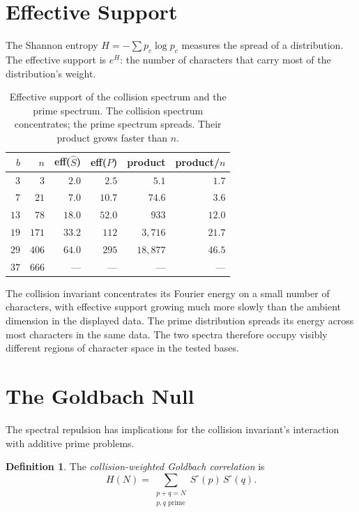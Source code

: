 \documentclass[12pt]{amsart}
\theoremstyle{definition}
\newtheorem{definition}[theorem]{Definition}
\theoremstyle{remark}
\begin{document}
\section{Effective Support}

The Shannon entropy $H = -\sum p_c \log p_c$ measures
the spread of a distribution. The effective support is
$e^H$: the number of characters that carry most of the
distribution's weight.

\begin{table}[h]
\centering
\begin{tabular}{rrrrrr}
\toprule
$b$ & $n$ & eff($\hat{S}$) & eff($P$) &
product & product/$n$ \\
\midrule
$3$ & $3$ & $2.0$ & $2.5$ & $5.1$ & $1.7$ \\
$7$ & $21$ & $7.0$ & $10.7$ & $74.6$ & $3.6$ \\
$13$ & $78$ & $18.0$ & $52.0$ & $933$ & $12.0$ \\
$19$ & $171$ & $33.2$ & $112$ & $3{,}716$ & $21.7$ \\
$29$ & $406$ & $64.0$ & $295$ & $18{,}877$ & $46.5$ \\
$37$ & $666$ & --- & --- & --- & --- \\
\bottomrule
\end{tabular}
\caption{Effective support of the collision spectrum
and the prime spectrum. The collision spectrum
concentrates; the prime spectrum spreads. Their
product grows faster than $n$.}
\label{tab:effective}
\end{table}

The collision invariant concentrates its Fourier energy
on a small number of characters, with effective support
growing much more slowly than the ambient dimension in
the displayed data. The prime distribution spreads its
energy across most characters in the same data. The two
spectra therefore occupy visibly different regions of
character space in the tested bases.

\section{The Goldbach Null}

The spectral repulsion has implications for the
collision invariant's interaction with additive
prime problems.

\begin{definition}
The \emph{collision-weighted Goldbach correlation} is
\[
H(N) = \sum_{\substack{p + q = N \\ p, q \text{ prime}}}
S^{\circ}(p)\, S^{\circ}(q).
\]
\end{definition}
\end{document}
